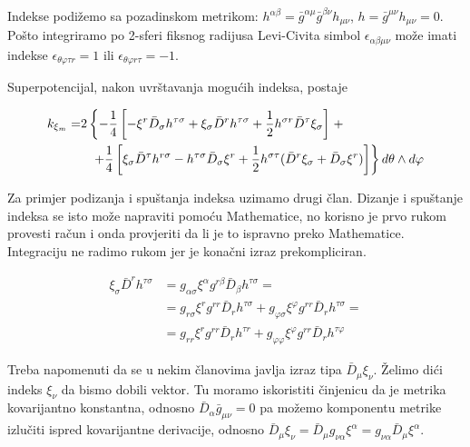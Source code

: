 \noindent Indekse podižemo sa pozadinskom metrikom: $h^{\alpha\beta}=\bar{g}^{\alpha\mu}\bar{g}^{\beta\nu}h_{\mu\nu}$, $h=\bar{g}^{\mu\nu}h_{\mu\nu}=0$. Pošto integriramo po 2-sferi fiksnog radijusa Levi-Civita simbol $\epsilon_{\alpha\beta\mu\nu}$ može imati indekse $\epsilon_{\theta\varphi\tau r}=1$ ili $\epsilon_{\theta\varphi r\tau}=-1$.

\noindent Superpotencijal, nakon uvrštavanja mogućih indeksa, postaje

\begin{equation}
\begin{split}
k_{\xi_m}=&2\left\{-\frac{1}{4}\left[-\xi^r\bar{D}_\sigma h^{\tau\sigma}+\xi_{\sigma}\bar{D}^r h^{\tau\sigma}+\frac{1}{2}h^{\sigma r}\bar{D}^\tau\xi_{\sigma}\right]\right.+\\
&\hspace{2.8mm}\left. +\frac{1}{4}\left[\xi_{\sigma}\bar{D}^\tau h^{r\sigma}-h^{\tau\sigma}\bar{D}_\sigma \xi^r+\frac{1}{2}h^{\sigma\tau}(\bar{D}^r\xi_{\sigma}+\bar{D}_\sigma\xi^r)\right]\right\}d\theta\wedge d\varphi
\end{split}
\end{equation}

\noindent Za primjer podizanja i spuštanja indeksa uzimamo drugi član. Dizanje i spuštanje indeksa se isto može napraviti pomoću Mathematice, no korisno je prvo rukom provesti račun i onda provjeriti da li je to ispravno preko Mathematice. Integraciju ne radimo rukom jer je konačni izraz prekompliciran.

\begin{equation}
\begin{split}
\xi_\sigma\bar{D}^r  h^{\tau \sigma}&=g_{\alpha\sigma}\xi^\alpha g^{r\beta}\bar{D}_\beta h^{\tau\sigma}=\\
&=g_{r\sigma}\xi^r g^{rr}\bar{D}_r h^{\tau\sigma}+g_{\varphi\sigma}\xi^\varphi g^{rr}\bar{D}_r h^{\tau\sigma}=\\
&=g_{rr}\xi^r g^{rr}\bar{D}_r h^{\tau r}+g_{\varphi\varphi}\xi^\varphi g^{rr}\bar{D}_r h^{\tau\varphi}
\end{split}
\end{equation}

\noindent Treba napomenuti da se u nekim članovima javlja izraz tipa $\bar{D}_\mu \xi_\nu$. Želimo dići indeks $\xi_\nu$ da bismo dobili vektor. Tu moramo iskoristiti činjenicu da je metrika kovarijantno konstantna, odnosno $\bar{D}_\alpha\bar{g}_{\mu\nu}=0$ pa možemo komponentu metrike izlučiti ispred kovarijantne derivacije, odnosno $\bar{D}_\mu \xi_\nu=\bar{D}_\mu g_{\nu\alpha} \xi^\alpha= g_{\nu\alpha}\bar{D}_\mu \xi^\alpha$.


